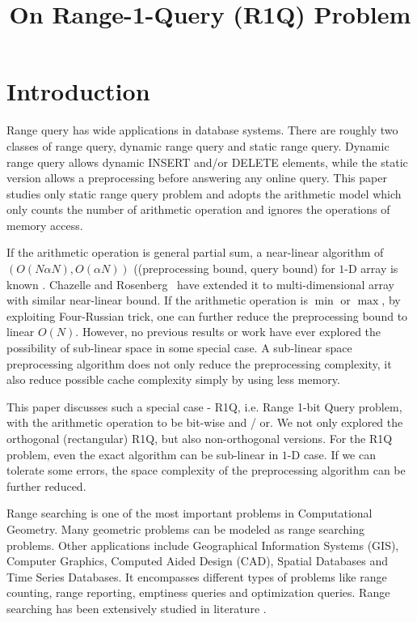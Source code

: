 \documentclass{article}
\title{On Range-1-Query (R1Q) Problem}
\date{}
\begin{document}
\maketitle
\section{Introduction}
Range query has wide applications in database systems. There are
roughly two classes of range query, dynamic range query and static range
query. Dynamic range query allows dynamic INSERT and/or DELETE elements,
while the static version allows a preprocessing before answering any
online query.  This paper studies only static range query problem and
adopts the arithmetic model which only counts the number of arithmetic
operation and ignores the operations of memory access.

If the arithmetic operation is general partial sum, a near-linear algorithm of $(O(N \alpha N), O(\alpha N))$ ((preprocessing bound, query bound) for $1$-D array is known \cite{yao}. Chazelle and Rosenberg~\cite{chazelle} have extended it to multi-dimensional array with similar near-linear bound. If the arithmetic operation is
$\min$ or $\max$, by exploiting Four-Russian trick, one can further reduce the preprocessing bound to linear $O(N)$. However, no previous results or work have ever explored the possibility of sub-linear space in some special case.  A sub-linear space preprocessing algorithm does not only reduce the preprocessing complexity, it also reduce possible cache complexity simply by using less memory.

This paper discusses such a special case - {R1Q}, i.e. Range 1-bit Query problem, with the arithmetic operation to be bit-wise and / or. We not only explored the orthogonal (rectangular) {R1Q}, but also non-orthogonal versions.  For the {R1Q} problem, even the exact algorithm can be sub-linear in $1$-D case. If we can tolerate some errors, the
space complexity of the preprocessing algorithm can be further reduced.

Range searching is one of the most important problems in Computational Geometry. Many geometric problems can be modeled as range searching problems. Other applications include Geographical Information Systems (GIS), Computer Graphics, Computed Aided Design (CAD), Spatial Databases and Time Series Databases. It encompasses different types of problems like range counting, range reporting, emptiness queries and optimization queries. Range searching has been extensively studied in literature \cite{sharir, agarwal, ishaque}.
\end{document}
